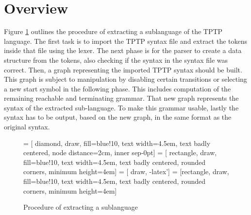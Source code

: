 \section{Overview}\label{sec:ConceptOverview}
Figure \ref{fig:ConceptProcessSublanguage} outlines the procedure of extracting a sublanguage of the \ac{TPTP} language.
The first task is to import the \ac{TPTP} syntax file and extract the tokens inside that file using the lexer.
The next phase is for the parser to create a data structure from the tokens, also checking if the syntax in the syntax file was correct.
Then, a graph representing the imported \ac{TPTP} syntax should be built.\\
This graph is subject to manipulation by disabling certain transitions or selecting a new start symbol in the following phase.
This includes computation of the remaining reachable and terminating grammar.
That new graph represents the syntax of the extracted sub-language.
To make this grammar usable, lastly the syntax has to be output, based on the new graph, in the same format as the original syntax.
\begin{figure}[H]
 = [ diamond, draw, fill=blue!10, text width=4.5em, text badly centered, node distance=2cm, inner sep-0pt]  
 = [ rectangle, draw, fill=blue!10, text width=4.5em, text badly centered, rounded corners, minimum height=4em]  
 = [ draw, -latex']  
 = [rectangle, draw, fill=blue!10, text width=4.5em, text badly centered, rounded corners, minimum height=4em]  
\begin{center}
\end{center}
\caption{Procedure of extracting a sublanguage}
\label{fig:ConceptProcessSublanguage}
\end{figure}

